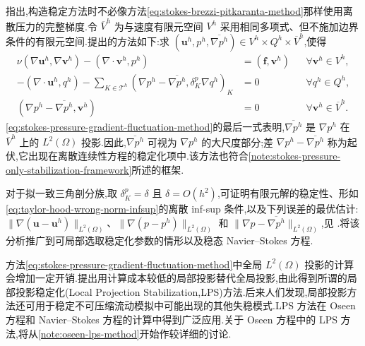 \begin{note}[压力梯度起伏稳定化]\label{note:stokes-pressure-gradient-fluctuations}
\textcite{CodinaBlasco1997}指出,构造稳定方法时不必像方法\cref{eq:stokes-brezzi-pitkaranta-method}那样使用离散压力的完整梯度.令 $\overline{V}^h$ 为与速度有限元空间 $V^h$ 采用相同多项式、但不施加边界条件的有限元空间.\textcite{CodinaBlasco1997}提出的方法如下:求
$(\bm{u}^h,p^h,\overline{\nabla p^h})\in V^h\times Q^h\times\overline{V}^h$,使得
\begin{equation}\label{eq:stokes-pressure-gradient-fluctuation-method}
\begin{aligned}
 \nu(\nabla\bm{u}^h,\nabla\bm{v}^h)
   -(\nabla\cdot\bm{v}^h,p^h)
   &=(\bm{f},\bm{v}^h)
     &&\forall\bm{v}^h\in V^h,\\
 -(\nabla\cdot\bm{u}^h,q^h)
   -\sum_{K\in\mathcal{T}^h}
      (\nabla p^h-\overline{\nabla p^h},
       \delta_K^p\nabla q^h)_K
   &=0
     &&\forall q^h\in Q^h,\\
 (\nabla p^h-\overline{\nabla p^h},\bm{v}^h)
   &=0
     &&\forall\bm{v}^h\in\overline{V}^h.
\end{aligned}
\end{equation}
\cref{eq:stokes-pressure-gradient-fluctuation-method}的最后一式表明,$\overline{\nabla p^h}$ 是 $\nabla p^h$ 在 $\overline{V}^h$ 上的 $L^2(\Omega)$ 投影.因此,$\overline{\nabla p^h}$ 可视为 $\nabla p^h$ 的大尺度部分;差 $\nabla p^h-\overline{\nabla p^h}$ 称为起伏,它出现在离散连续性方程的稳定化项中.该方法也符合\cref{note:stokes-pressure-only-stabilization-framework}所述的框架.

对于拟一致三角剖分族,取 $\delta_K^p=\delta$ 且 $\delta=O(h^2)$,可证明有限元解的稳定性、形如\cref{eq:taylor-hood-wrong-norm-infsup}的离散 inf-sup 条件,以及下列误差的最优估计:$\|\nabla(\bm{u}-\bm{u}^h)\|_{L^2(\Omega)}$、$\|\nabla(p-p^h)\|_{L^2(\Omega)}$ 和 $\|\nabla p-\overline{\nabla p^h}\|_{L^2(\Omega)}$,见 \textcite{CodinaBlasco1997}.\textcite{CodinaBlasco2000}将该分析推广到可局部选取稳定化参数的情形以及稳态 Navier--Stokes 方程.
\end{note}

\begin{note}\label{note:stokes-local-projection-stabilization}
方法\cref{eq:stokes-pressure-gradient-fluctuation-method}中全局 $L^2(\Omega)$ 投影的计算会增加一定开销.\textcite{BeckerBraack2001}提出用计算成本较低的局部投影替代全局投影,由此得到所谓的局部投影稳定化(Local Projection Stabilization,LPS)方法.后来人们发现,局部投影方法还可用于稳定不可压缩流动模拟中可能出现的其他失稳模式.LPS 方法在 Oseen 方程和 Navier--Stokes 方程的计算中得到广泛应用.关于 Oseen 方程中的 LPS 方法,将从\cref{note:oseen-lps-method}开始作较详细的讨论.
\end{note}

